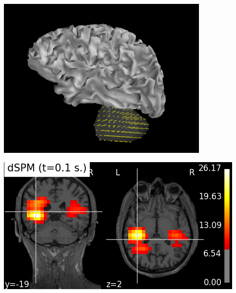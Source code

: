 \documentclass[t,11pt,compress]{beamer} %
\newcommand{\vfillll}{\vfilll\vfilll\vfilll\vfilll\vfilll\vfilll\vfilll\vfilll\vfilll\vfilll\vfilll\vfilll\vfilll\vfilll\vfilll\vfilll\vfilll\vfilll\vfilll\vfilll\vfilll\vfilll\vfilll\vfilll\vfilll\vfilll\vfilll\vfilll\vfilll\vfilll\vfilll\vfilll\vfilll\vfilll\vfilll\vfilll\vfilll\vfilll\vfilll\vfilll}
\begin{document}
\begin{frame}[plain,t,c]
\vfillll


\vfillll

\vspace*{-2.6em}%


\begin{minipage}{1.09\linewidth}

\hspace{-0.1em}%
\begin{minipage}{.225\linewidth}
    \includegraphics[width=0.8\linewidth]{mixed_source_space.png}%
\end{minipage}%
\hspace{-2.0em}%
\begin{minipage}{.25\linewidth}
    \includegraphics[width=\linewidth]{dspm_volumetric_cropped.png}
\end{minipage}%
\hspace{-.4em}%

\end{minipage}
\end{frame}
\end{document}
